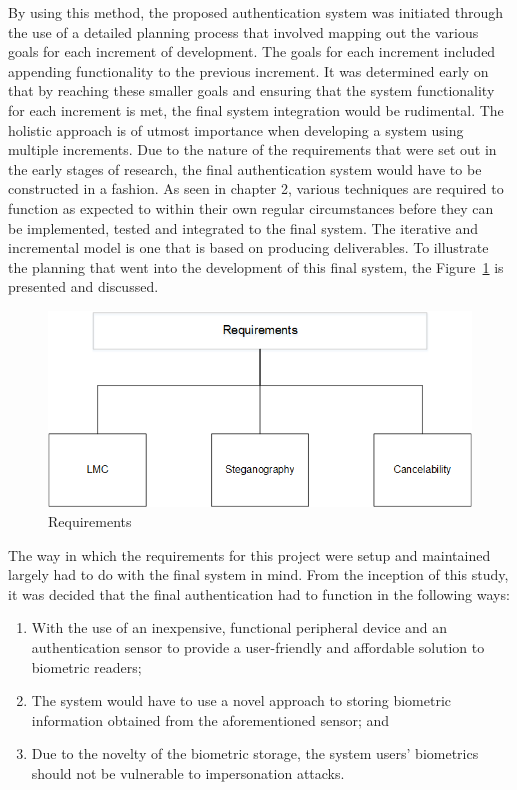 By using this method, the proposed authentication system was initiated through the use of a detailed planning process that involved mapping out the various goals for each increment of development. The goals for each increment included appending functionality to the previous increment. It was determined early on that by reaching these smaller goals and ensuring that the system functionality for each increment is met, the final system integration would be rudimental. The holistic approach is of utmost importance when developing a system using multiple increments. Due to the nature of the requirements that were set out in the early stages of research, the final authentication system would have to be constructed in a fashion. As seen in chapter 2, various techniques are required to function as expected to within their own regular circumstances before they can be implemented, tested and integrated to the final system. 
The iterative and incremental model is one that is based on producing deliverables. To illustrate the planning that went into the development of this final system, the Figure~\ref{fig:Requirements} is presented and discussed. 

    
    \begin{figure}[htbp!] 
    \centering    
    \includegraphics[width=1.0\textwidth]{Chapter3/Figs/Figure3-2.png}
    \caption[Requirements]{Requirements}
    \label{fig:Requirements}
    \end{figure}    
    
    The way in which the requirements for this project were setup and maintained largely had to do with the final system in mind. From the inception of this study, it was decided that the final authentication had to function in the following ways:
    
    \begin{enumerate}[label=\roman*.]
    	\item With the use of an inexpensive, functional peripheral device and an authentication sensor to provide a user-friendly and affordable solution to biometric readers;
    	\item The system would have to use a novel approach to storing biometric information obtained from the aforementioned sensor; and
    	\item Due to the novelty of the biometric storage, the system users’ biometrics should not be vulnerable to impersonation attacks.
    \end{enumerate}
    
